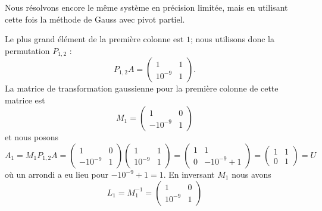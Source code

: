\begin{example}     \label{EXooNCRSooTfmPFr}
    Nous résolvons encore le même système en précision limitée, mais en utilisant cette fois la méthode de Gauss avec pivot partiel.    

    Le plus grand élément de la première colonne est \( 1\); nous utilisons donc la permutation \( P_{1,2}\) :
    \begin{equation}
        P_{1,2}A=\begin{pmatrix}
            1    &   1    \\ 
            10^{-9}    &       1
        \end{pmatrix}.
    \end{equation}
    La matrice de transformation gaussienne pour la première colonne de cette matrice est
    \begin{equation}
        M_1=\begin{pmatrix}
            1    &   0    \\ 
            -10^{-9}    &  1  
        \end{pmatrix}
    \end{equation}
    et nous posons
    \begin{equation}
        A_1=M_1P_{1,2}A=
        \begin{pmatrix}
            1    &   0    \\ 
            -10^{-9}    &   1    
        \end{pmatrix}
        \begin{pmatrix}
            1    &   1    \\ 
            10^{-9}    &   1    
        \end{pmatrix}
        =\begin{pmatrix}
            1    &   1    \\ 
            0    &   -10^{-9}+1    
        \end{pmatrix}=
        \begin{pmatrix}
            1    &   1    \\ 
            0    &   1    
        \end{pmatrix}=U
    \end{equation}
    où un arrondi a eu lieu pour \( -10^{-9}+1=1\). En inversant \( M_1\) nous avons
    \begin{equation}
        L_1=M_1^{-1}=\begin{pmatrix}
            1    &   0    \\ 
            10^{-9}    &   1    

\end{pmatrix}
\end{equation}
\end{example}
